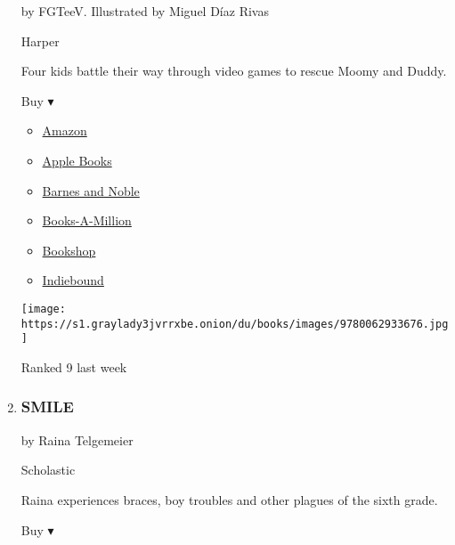 \begin{enumerate}
  by FGTeeV. Illustrated by Miguel Díaz Rivas

  Harper

  Four kids battle their way through video games to rescue Moomy and
  Duddy.

  Buy ▾

  \begin{itemize}
  \tightlist
  \item
    \href{https://www.amazon.com/FGTeeV-Presents-Into-Game/dp/0062933671?tag=NYTBS-20}{Amazon}
  \item
    \href{https://du-gae-books-dot-nyt-du-prd.appspot.com/buy?title=FGTEEV+PRESENTS\%3A+INTO+THE+GAME\%21\&author=FGTeeV}{Apple
    Books}
  \item
    \href{https://www.anrdoezrs.net/click-7990613-11819508?url=https\%3A\%2F\%2Fwww.barnesandnoble.com\%2Fw\%2F\%3Fean\%3D9780062933676}{Barnes
    and Noble}
  \item
    \href{https://www.anrdoezrs.net/click-7990613-35140?url=https\%3A\%2F\%2Fwww.booksamillion.com\%2Fp\%2FFGTEEV\%2BPRESENTS\%253A\%2BINTO\%2BTHE\%2BGAME\%2521\%2FFGTeeV\%2F9780062933676}{Books-A-Million}
  \item
    \href{https://bookshop.org/a/3546/9780062933676}{Bookshop}
  \item
    \href{https://www.indiebound.org/book/9780062933676?aff=NYT}{Indiebound}
  \end{itemize}

  \texttt{[image: https://s1.graylady3jvrrxbe.onion/du/books/images/9780062933676.jpg]}

  Ranked 9 last week
\item
  \hypertarget{smile}{%
  \subsubsection{SMILE}\label{smile}}

  by Raina Telgemeier

  Scholastic

  Raina experiences braces, boy troubles and other plagues of the sixth
  grade.

  Buy ▾


\end{enumerate}
